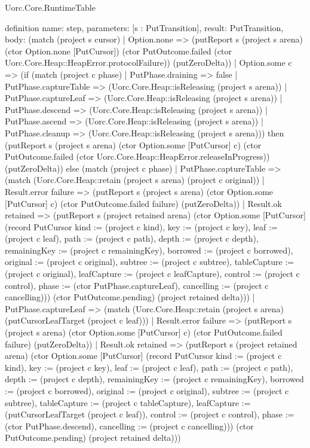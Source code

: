\begin{lexlean}{Uorc.Core.RuntimeTable}
\begin{semanticmodule}
definition{
  name: step,
  parameters: [s : PutTransition],
  result: PutTransition,
  body: (match (project s cursor)
    | Option.none => (putReport s (project s arena) (ctor Option.none [PutCursor]) (ctor PutOutcome.failed (ctor Uorc.Core.Heap::HeapError.protocolFailure)) (putZeroDelta))
    | Option.some c => (if (match (project c phase)
      | PutPhase.draining => false
      | PutPhase.captureTable => (Uorc.Core.Heap::isReleasing (project s arena))
      | PutPhase.captureLeaf => (Uorc.Core.Heap::isReleasing (project s arena))
      | PutPhase.descend => (Uorc.Core.Heap::isReleasing (project s arena))
      | PutPhase.ascend => (Uorc.Core.Heap::isReleasing (project s arena))
      | PutPhase.cleanup => (Uorc.Core.Heap::isReleasing (project s arena))) then (putReport s (project s arena) (ctor Option.some [PutCursor] c) (ctor PutOutcome.failed (ctor Uorc.Core.Heap::HeapError.releaseInProgress)) (putZeroDelta)) else (match (project c phase)
      | PutPhase.captureTable => (match (Uorc.Core.Heap::retain (project s arena) (project c original))
        | Result.error failure => (putReport s (project s arena) (ctor Option.some [PutCursor] c) (ctor PutOutcome.failed failure) (putZeroDelta))
        | Result.ok retained => (putReport s (project retained arena) (ctor Option.some [PutCursor] (record PutCursor {kind := (project c kind), key := (project c key), leaf := (project c leaf), path := (project c path), depth := (project c depth), remainingKey := (project c remainingKey), borrowed := (project c borrowed), original := (project c original), subtree := (project c subtree), tableCapture := (project c original), leafCapture := (project c leafCapture), control := (project c control), phase := (ctor PutPhase.captureLeaf), cancelling := (project c cancelling)})) (ctor PutOutcome.pending) (project retained delta)))
      | PutPhase.captureLeaf => (match (Uorc.Core.Heap::retain (project s arena) (putCursorLeafTarget (project c leaf)))
        | Result.error failure => (putReport s (project s arena) (ctor Option.some [PutCursor] c) (ctor PutOutcome.failed failure) (putZeroDelta))
        | Result.ok retained => (putReport s (project retained arena) (ctor Option.some [PutCursor] (record PutCursor {kind := (project c kind), key := (project c key), leaf := (project c leaf), path := (project c path), depth := (project c depth), remainingKey := (project c remainingKey), borrowed := (project c borrowed), original := (project c original), subtree := (project c subtree), tableCapture := (project c tableCapture), leafCapture := (putCursorLeafTarget (project c leaf)), control := (project c control), phase := (ctor PutPhase.descend), cancelling := (project c cancelling)})) (ctor PutOutcome.pending) (project retained delta)))
}
\end{semanticmodule}
\end{lexlean}
